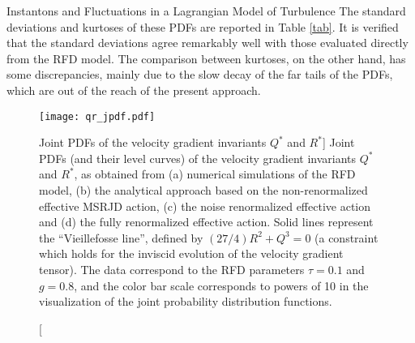 \begin{chapter}{Instantons and Fluctuations in a Lagrangian Model of Turbulence}
The standard deviations and kurtoses of these PDFs are reported in Table \ref{tab}. It is verified that the standard deviations agree remarkably well with those evaluated directly from the RFD model. 
The comparison between kurtoses, on the other hand, has some discrepancies, mainly due to the slow decay of the far tails of the PDFs, which are out of the reach of the present approach.



\begin{figure}[ht]
 \centering
 \texttt{[image: qr\_jpdf.pdf]}
 \caption
 [Joint PDFs of the velocity gradient invariants $Q^*$ and $R^*$]
 {Joint PDFs (and their level curves) of the velocity gradient invariants $Q^*$ and $R^*$, as obtained from (a) numerical simulations of the RFD model,
 (b) the analytical approach based on the non-renormalized effective MSRJD action, (c) the noise renormalized effective action and (d) the fully renormalized  effective action.
 Solid lines represent the \enquote{Vieillefosse line}, defined by $(27/4)R^2 + Q^3 = 0$ (a constraint which holds for the inviscid evolution of the velocity gradient tensor). The data correspond to the RFD parameters $\tau=0.1$ and $g=0.8$,  and the color bar scale corresponds to powers of 10 in the visualization of the joint probability distribution functions.
 }
 \label{fig:QR}
\end{figure}


\end{chapter}
